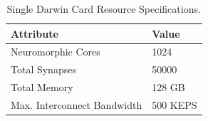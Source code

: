 \begin{table}[htbp]

\centering

\caption{Single Darwin Card Resource Specifications.}

\label{tab:card_spec}

\begin{tabular}{@{}ll@{}}

\toprule

Attribute                  & Value             \\ \midrule

Neuromorphic Cores         & 1024            \\

Total Synapses             & 50000       \\

Total Memory               & 128 GB            \\

Max. Interconnect Bandwidth & 500 KEPS \\ \bottomrule

\end{tabular}

\end{table} 
